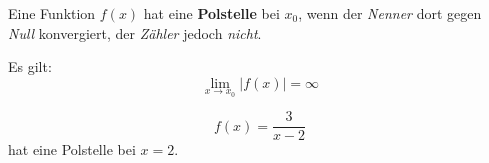 \documentclass{scrartcl}
\begin{document}
\begin{preview}
\begin{minipage}{\myPageWidth}
\begin{marked}
    Eine Funktion $f(x)$ hat eine \textbf{Polstelle} bei $x_0$, 
    wenn der \emph{Nenner} dort gegen \emph{Null} konvergiert,
    der \emph{Zähler} jedoch \emph{nicht}.  
\end{marked}

Es gilt:
\[ \lim_{x \to x_0} |f(x)| = \infty \]

\begin{example}
    \[ f(x) = \frac{3}{x - 2} \]
    hat eine Polstelle bei 
    \(x=2.\)
\end{example}

\begin{center}
\end{center}

\end{minipage}
\end{preview}
\end{document}
